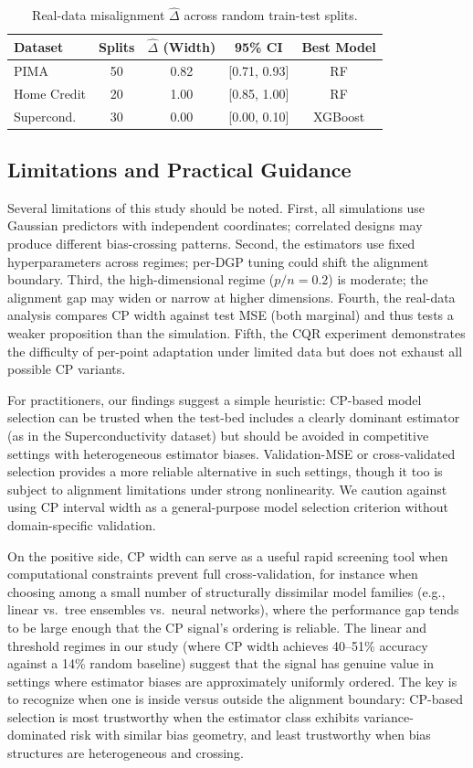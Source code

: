 \documentclass[a4paper,11pt]{article}
\begin{document}
\begin{table}[t]
    \centering
    \caption{Real-data misalignment $\hat{\Delta}$ across random train-test splits.}
    \label{tab:real}
    \begin{tabular}{lcccc}
        \toprule
        Dataset & Splits & $\hat{\Delta}$ (Width) & 95\% CI & Best Model \\
        \midrule
        PIMA            & 50 & 0.82 & [0.71, 0.93] & RF \\
        Home Credit     & 20 & 1.00 & [0.85, 1.00] & RF \\
        Supercond.      & 30 & 0.00 & [0.00, 0.10] & XGBoost \\
        \bottomrule
    \end{tabular}
\end{table}

\subsection*{Limitations and Practical Guidance}
Several limitations of this study should be noted. First, all simulations use Gaussian predictors with independent coordinates; correlated designs may produce different bias-crossing patterns. Second, the estimators use fixed hyperparameters across regimes; per-DGP tuning could shift the alignment boundary. Third, the high-dimensional regime ($p/n = 0.2$) is moderate; the alignment gap may widen or narrow at higher dimensions. Fourth, the real-data analysis compares CP width against test MSE (both marginal) and thus tests a weaker proposition than the simulation. Fifth, the CQR experiment demonstrates the difficulty of per-point adaptation under limited data but does not exhaust all possible CP variants.

For practitioners, our findings suggest a simple heuristic: CP-based model selection can be trusted when the test-bed includes a clearly dominant estimator (as in the Superconductivity dataset) but should be avoided in competitive settings with heterogeneous estimator biases. Validation-MSE or cross-validated selection provides a more reliable alternative in such settings, though it too is subject to alignment limitations under strong nonlinearity. We caution against using CP interval width as a general-purpose model selection criterion without domain-specific validation.

On the positive side, CP width can serve as a useful rapid screening tool when computational constraints prevent full cross-validation, for instance when choosing among a small number of structurally dissimilar model families (e.g., linear vs.\ tree ensembles vs.\ neural networks), where the performance gap tends to be large enough that the CP signal's ordering is reliable. The linear and threshold regimes in our study (where CP width achieves 40--51\% accuracy against a 14\% random baseline) suggest that the signal has genuine value in settings where estimator biases are approximately uniformly ordered. The key is to recognize when one is inside versus outside the alignment boundary: CP-based selection is most trustworthy when the estimator class exhibits variance-dominated risk with similar bias geometry, and least trustworthy when bias structures are heterogeneous and crossing.
\end{document}
